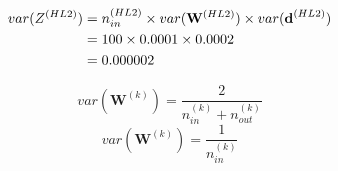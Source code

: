 \documentclass[xcolor={table}]{beamer}
\begin{document}
 \begin{frame} 
\begin{alignat}{2}
var(Z^{(HL2)})& = n_{in}^{(HL2)} \times var(\mathbf{W}^{(HL2)}) \times var(\textbf{d}^{(HL2)})\\ \notag
& =  100 \times 0.0001 \times 0.0002\\ \notag
& = 0.000002
\end{alignat}
\end{frame} 



 \begin{frame} 
\begin{equation}
var(\mathbf{W}^{(k)})=\frac{2}{n_{in}^{(k)}+n_{out}^{(k)}}
\label{eq:xavierinout}
\end{equation}
\begin{equation}
var(\mathbf{W}^{(k)})=\frac{1}{n_{in}^{(k)}}
\label{eq:xavier}
\end{equation}
\end{frame} 
\end{document}
